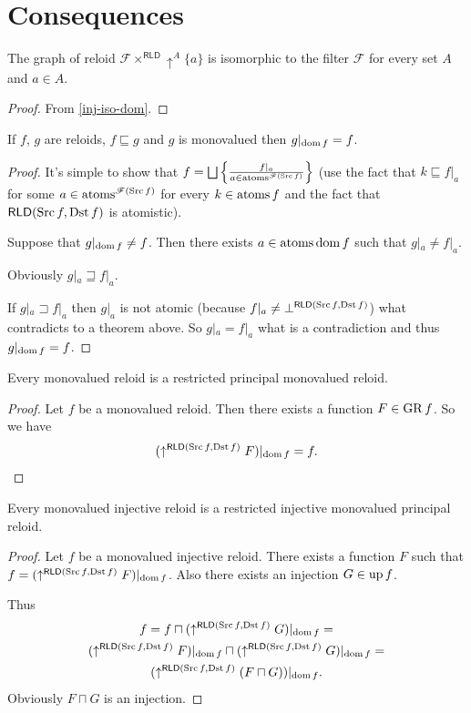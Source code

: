 \section{Consequences}
\begin{thm}
\label{triv-atom-prod}The graph of reloid $\mathcal{F}\times^{\mathsf{RLD}}\uparrow^{A}\{a\}$
is isomorphic to the filter $\mathcal{F}$ for every set $A$ and
$a\in A$.\end{thm}
\begin{proof}
From \ref{inj-iso-dom}.\end{proof}
\begin{thm}
If $f$, $g$ are reloids, $f\sqsubseteq g$ and $g$ is monovalued
then $g|_{\operatorname{dom} f}=f$.\end{thm}
\begin{proof}
It's simple to show that $f=\bigsqcup\setcond{f|_{a}}{a\in\atoms^{\mathscr{F}(\Src f)}}$
(use the fact that $k\sqsubseteq f|_{a}$ for some $a\in\operatorname{atoms}^{\mathscr{F}(\operatorname{Src} f)}$
for every $k\in\operatorname{atoms} f$ and the fact that $\mathsf{RLD}(\operatorname{Src} f,\operatorname{Dst} f)$
is atomistic).

Suppose that $g|_{\operatorname{dom} f}\neq f$. Then there exists $a\in\operatorname{atoms}\operatorname{dom} f$
such that $g|_{a}\neq f|_{a}$.

Obviously $g|_{a}\sqsupseteq f|_{a}$.

If $g|_{a}\sqsupset f|_{a}$ then $g|_{a}$ is not atomic (because
$f|_{a}\ne\bot^{\mathsf{RLD}(\operatorname{Src} f,\operatorname{Dst} f)}$) what contradicts to
a theorem above. So $g|_{a}=f|_{a}$ what is a contradiction and thus
$g|_{\operatorname{dom} f}=f$.\end{proof}
\begin{cor}
\label{mv-is-restr}Every monovalued reloid is a restricted principal
monovalued reloid.\end{cor}
\begin{proof}
Let $f$ be a monovalued reloid. Then there exists a function $F\in\operatorname{GR} f$.
So we have
\[
(\uparrow^{\mathsf{RLD}(\operatorname{Src} f,\operatorname{Dst} f)}F)|_{\operatorname{dom} f}=f.
\]
\end{proof}
\begin{cor}
Every monovalued injective reloid is a restricted injective monovalued
principal reloid.\end{cor}
\begin{proof}
Let $f$ be a monovalued injective reloid. There exists a function
$F$ such that $f=(\uparrow^{\mathsf{RLD}(\operatorname{Src} f,\operatorname{Dst} f)}F)|_{\operatorname{dom} f}$.
Also there exists an injection $G\in\operatorname{up} f$.

Thus
\begin{multline*}
f=f\sqcap(\uparrow^{\mathsf{RLD}(\operatorname{Src} f,\operatorname{Dst} f)}G)|_{\operatorname{dom} f}=\\
(\uparrow^{\mathsf{RLD}(\operatorname{Src} f,\operatorname{Dst} f)}F)|_{\operatorname{dom} f}\sqcap(\uparrow^{\mathsf{RLD}(\operatorname{Src} f,\operatorname{Dst} f)}G)|_{\operatorname{dom} f}=\\
(\uparrow^{\mathsf{RLD}(\operatorname{Src} f,\operatorname{Dst} f)}(F\sqcap G))|_{\operatorname{dom} f}.
\end{multline*}
Obviously $F\sqcap G$ is an injection.\end{proof}
